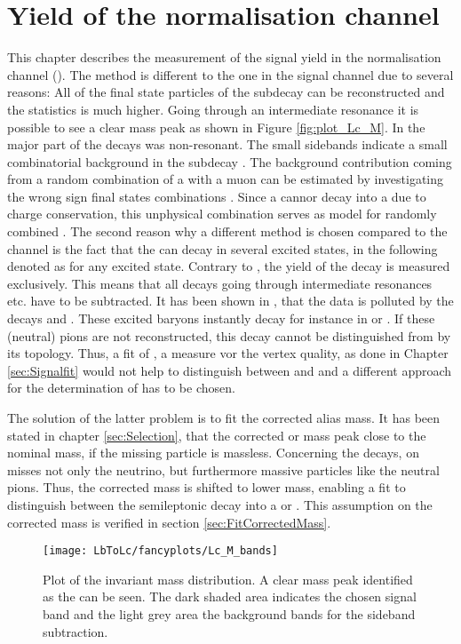 \chapter{Yield of the normalisation channel \LbToLcmunu}
\label{sec:Normalisationfit}
This chapter describes the measurement of the signal yield \NLc in the normalisation channel \LbToLcmunu (\LcTopKpi). 
The method is different to the one in the signal channel \LbToDpmunuX due to several reasons:
All of the final state particles of the subdecay \LcTopKpi can be reconstructed and the statistics is much higher. 
Going through an intermediate resonance it is possible to see a clear \Lc mass peak as shown in Figure \ref{fig:plot_Lc_M}.
In \LbToDpmunuX the major part of the decays was non-resonant.
The small sidebands indicate a small combinatorial background in the subdecay \LcTopKpi.
The background contribution coming from a random combination of a \Lc with a muon can be estimated by investigating the wrong sign final states combinations \Lc\mup.
Since a \Lb cannor decay into a \Lc\mup due to charge conservation, this unphysical combination serves as model for randomly combined \Lc\mun.
The second reason why a different method is chosen compared to the \LbToDpmunuX channel is the fact that the \Lb can decay in several excited \Lc states, in the following denoted as \Lcstar for any excited \Lc state.
Contrary to \LbToDpmunuX, the yield of the decay \LbToLcmunu is measured exclusively.
This means that all decays going through intermediate resonances etc. have to be subtracted.
It has been shown in \cite{SL_Vub}, that the \LbToLcmunu data is polluted by the decays  and .
These excited \Lcstar baryons instantly decay for instance in \Lc\pip\pim or \Lc\piz. 
If these (neutral) pions are not reconstructed, this decay cannot be distinguished from \LbToLcmunu by its topology.
Thus, a fit of \logIP, a measure vor the vertex quality, as done in Chapter \ref{sec:Signalfit} would not help to distinguish between \LbToLcmunu and \decay{\Lb}{\Lcstar\mun\neumb} and a different approach for the determination of \NLc has to be chosen.

The solution of the latter problem is to fit the corrected \pKpi\mun alias \Lb mass.
It has been stated in chapter \ref{sec:Selection}, that the corrected \pKpi\mun or \Lb mass peak close to the nominal \Lb mass, if the missing particle is massless.
Concerning the \decay{\Lb}{\Lcstar\mun\neumb} decays, on misses not only the neutrino, but furthermore massive particles like the neutral pions.
Thus, the corrected \Lb mass is shifted to lower mass, enabling a fit to distinguish between the semileptonic \Lb decay into a \Lc or \Lcstar.
This assumption on the corrected mass is verified in section \ref{sec:FitCorrectedMass}.
\begin{figure}[ptb]
    \centering
	\texttt{[image: LbToLc/fancyplots/Lc\_M\_bands]}	
	\caption{Plot of the invariant \pKpi mass distribution. A clear mass peak identified as the \Lc can be seen. The dark shaded area indicates the chosen signal band and the light grey area the background bands for the sideband subtraction.}
	\label{fig:plot_Lc_M_bands}
\end{figure}

